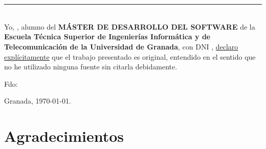 

\chapter*{}
\thispagestyle{empty}

\noindent\rule[-1ex]{\textwidth}{2pt}\\[4.5ex]

Yo, \textbf{\estudiante}, alumno del \textbf{MÁSTER DE DESARROLLO DEL
	SOFTWARE} de la \textbf{Escuela Técnica Superior de Ingenierías
	Informática y de Telecomunicación de la Universidad de Granada}, con DNI
\textbf{\dni}, \underline{declaro explícitamente} que el trabajo
presentado es original, entendido en el sentido que no he utilizado ninguna
fuente sin citarla debidamente.

\vspace{6cm}

\noindent Fdo: \textbf{\estudiante}

\vspace{2cm}

\begin{flushright}
	Granada, \today.
\end{flushright}


\chapter*{Agradecimientos}
\thispagestyle{empty}

\vspace{1cm}



